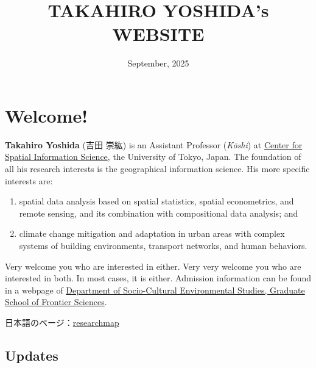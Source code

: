 \documentclass[
]{book}
\title{TAKAHIRO YOSHIDA's WEBSITE}
\author{}
\date{\vspace{-2.5em}September, 2025}
\providecommand{\tightlist}{%
  \setlength{\itemsep}{0pt}\setlength{\parskip}{0pt}}
\begin{document}
\maketitle

{
\setcounter{tocdepth}{1}
\tableofcontents
}
\chapter*{Welcome!}\label{welcome}

\textbf{Takahiro Yoshida} (吉田 崇紘) is an Assistant Professor (\emph{Kōshi}) at \href{https://www.csis.u-tokyo.ac.jp/}{Center for Spatial Information Science}, the University of Tokyo, Japan. The foundation of all his research interests is the geographical information science. His more specific interests are:

\begin{enumerate}
\def\labelenumi{(\arabic{enumi})}
\tightlist
\item
  spatial data analysis based on spatial statistics, spatial econometrics, and remote sensing, and its combination with compositional data analysis; and
\item
  climate change mitigation and adaptation in urban areas with complex systems of building environments, transport networks, and human behaviors.
\end{enumerate}

Very welcome you who are interested in either. Very very welcome you who are interested in both. In most cases, it is either. Admission information can be found in a webpage of \href{https://sbk.k.u-tokyo.ac.jp/index_e.html}{Department of Socio-Cultural Environmental Studies, Graduate School of Frontier Sciences}.

日本語のページ：\href{https://researchmap.jp/yoshida.takahiro}{researchmap}

\section*{Updates}\label{updates}
\end{document}
